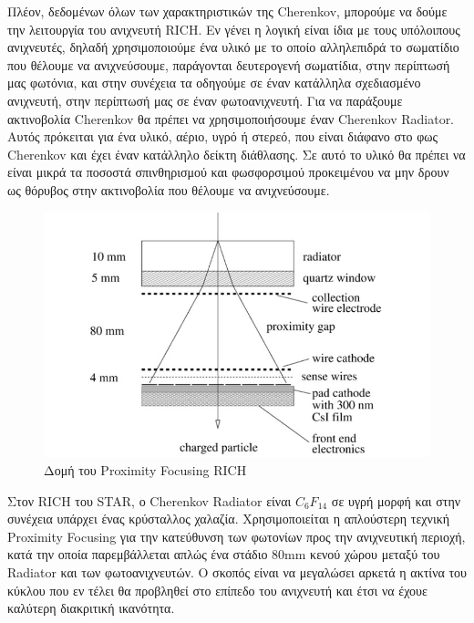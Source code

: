 
 	
 	Πλέον, δεδομένων όλων των χαρακτηριστικών της Cherenkov, μπορούμε να δούμε την λειτουργία του ανιχνευτή RICH. Εν γένει η λογική είναι ίδια με τους υπόλοιπους ανιχνευτές, δηλαδή χρησιμοποιούμε ένα υλικό με το οποίο αλληλεπιδρά το σωματίδιο που θέλουμε να ανιχνεύσουμε, παράγονται δευτερογενή σωματίδια, στην περίπτωσή μας φωτόνια, και στην συνέχεια τα οδηγούμε σε έναν κατάλληλα σχεδιασμένο ανιχνευτή, στην περίπτωσή μας σε έναν φωτοανιχνευτή. 
 	Για να παράξουμε ακτινοβολία Cherenkov θα πρέπει να χρησιμοποιήσουμε έναν Cherenkov Radiator. Aυτός πρόκειται για ένα υλικό, αέριο, υγρό ή στερεό, που είναι διάφανο στο φως Cherenkov και έχει έναν κατάλληλο δείκτη διάθλασης. Σε αυτό το υλικό θα πρέπει να είναι μικρά τα ποσοστά σπινθηρισμού και φωσφορσιμού προκειμένου να μην δρουν ως θόρυβος στην ακτινοβολία που θέλουμε να ανιχνεύσουμε. 
 	
 	\begin{figure}[h!]
 		\centering
 		\includegraphics[scale=0.5]{STAR_Detectors/RICH_star_layout}
 		\caption{Δομή του Proximity Focusing RICH}
 		\label{fig3.21}
 	\end{figure}
 	
 	Στον RICH του STAR, ο Cherenkov Radiator είναι $C_6F_{14}$ σε υγρή μορφή και στην συνέχεια υπάρχει ένας κρύσταλλος χαλαζία. 
 	Χρησιμοποιείται η απλούστερη τεχνική Proximity Focusing για την κατεύθυνση των φωτονίων προς την ανιχνευτική περιοχή, κατά την οποία παρεμβάλλεται απλώς ένα στάδιο 80mm κενού χώρου μεταξύ του Radiator και των φωτοανιχνευτών. Ο σκοπός είναι να μεγαλώσει αρκετά η ακτίνα του κύκλου που εν τέλει θα προβληθεί στο επίπεδο του ανιχνευτή και έτσι να έχουε καλύτερη διακριτική ικανότητα.
 	

